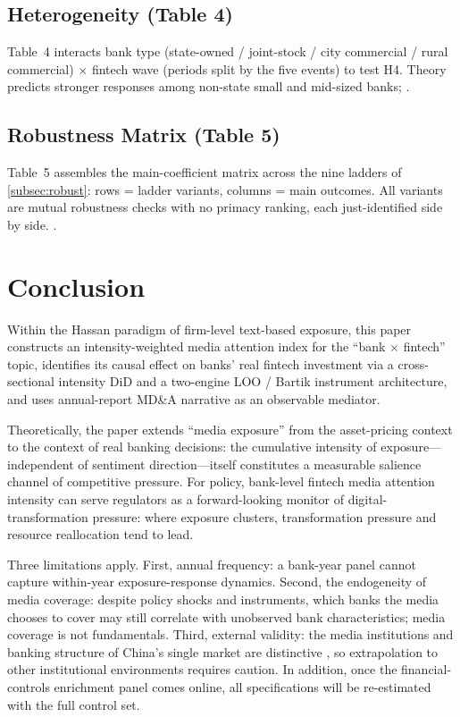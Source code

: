 \subsection{Heterogeneity (Table 4)}
Table~4 interacts bank type (state-owned / joint-stock / city commercial /
rural commercial) $\times$ fintech wave (periods split by the five events) to
test H4. Theory predicts stronger responses among non-state small and
mid-sized banks; .

\subsection{Robustness Matrix (Table 5)}
Table~5 assembles the main-coefficient matrix across the nine ladders of
\ref{subsec:robust}: rows = ladder variants, columns = main outcomes. All
variants are mutual robustness checks with no primacy ranking, each
just-identified side by side. .

\section{Conclusion}\label{sec:conclusion}

Within the Hassan paradigm of firm-level text-based exposure, this paper
constructs an intensity-weighted media attention index for the ``bank $\times$
fintech'' topic, identifies its causal effect on banks' real fintech
investment via a cross-sectional intensity DiD and a two-engine LOO / Bartik
instrument architecture, and uses annual-report MD\&A narrative as an
observable mediator. 

Theoretically, the paper extends ``media exposure'' from the asset-pricing
context to the context of real banking decisions: the cumulative intensity of
exposure---independent of sentiment direction---itself constitutes a
measurable salience channel of competitive pressure. For policy, bank-level
fintech media attention intensity can serve regulators as a forward-looking
monitor of digital-transformation pressure: where exposure clusters, transformation
pressure and resource reallocation tend to lead. 

Three limitations apply. First, annual frequency: a bank-year panel cannot
capture within-year exposure-response dynamics. Second, the endogeneity of
media coverage: despite policy shocks and instruments, which banks the media
chooses to cover may still correlate with unobserved bank characteristics;
media coverage is not fundamentals. Third, external validity: the media
institutions and banking structure of China's single market are distinctive
\parencite{qin2018mediabias}, so extrapolation to other institutional
environments requires caution. In addition, once the financial-controls
enrichment panel comes online, all specifications will be re-estimated with
the full control set.

\printbibliography


